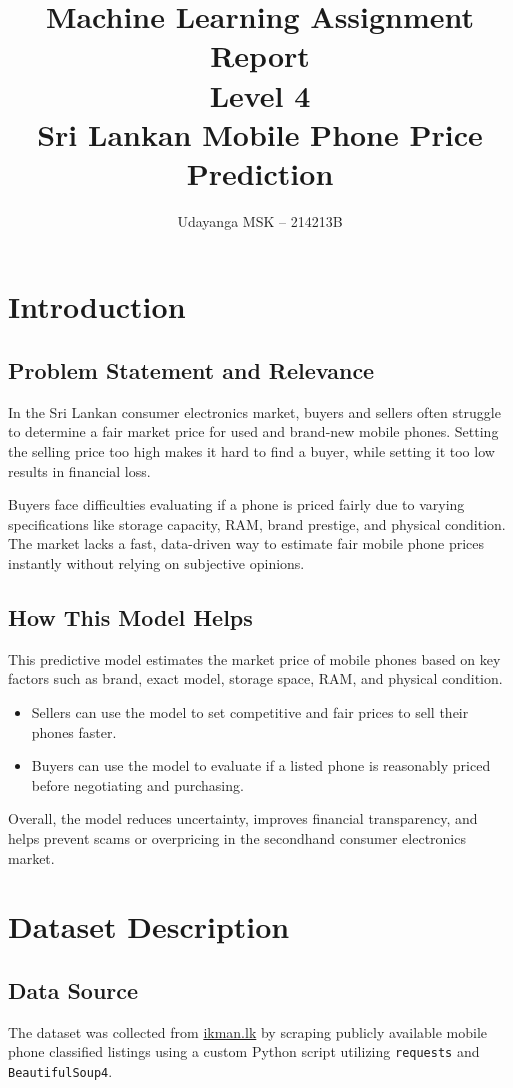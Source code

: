 \documentclass[12pt,a4paper]{article}
\title{
\textbf{\LARGE Machine Learning Assignment Report}\\[1cm]
\Large Level 4\\[0.6cm]
\large Sri Lankan Mobile Phone Price Prediction
}
\author{Udayanga MSK – 214213B}
\date{}
\begin{document}
\maketitle
\newpage

\tableofcontents
\newpage

\section{Introduction}

\subsection{Problem Statement and Relevance}
In the Sri Lankan consumer electronics market, buyers and sellers often struggle to determine a fair market price for used and brand-new mobile phones. Setting the selling price too high makes it hard to find a buyer, while setting it too low results in financial loss. 

Buyers face difficulties evaluating if a phone is priced fairly due to varying specifications like storage capacity, RAM, brand prestige, and physical condition. The market lacks a fast, data-driven way to estimate fair mobile phone prices instantly without relying on subjective opinions. 

\subsection{How This Model Helps}
This predictive model estimates the market price of mobile phones based on key factors such as brand, exact model, storage space, RAM, and physical condition. 
\begin{itemize}
    \item Sellers can use the model to set competitive and fair prices to sell their phones faster. 
    \item Buyers can use the model to evaluate if a listed phone is reasonably priced before negotiating and purchasing. 
\end{itemize}
Overall, the model reduces uncertainty, improves financial transparency, and helps prevent scams or overpricing in the secondhand consumer electronics market. 

\section{Dataset Description}

\subsection{Data Source}
The dataset was collected from \href{https://ikman.lk}{ikman.lk} by scraping publicly available mobile phone classified listings using a custom Python script utilizing \texttt{requests} and \texttt{BeautifulSoup4}. 
\end{document}
